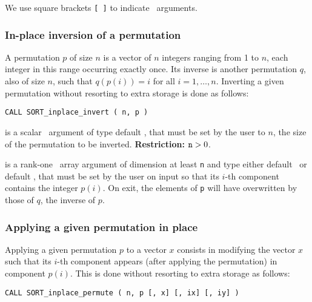 \documentclass{galahad}
\newcommand{\packagename}{SORT}
\begin{document}
\noindent
We use square brackets {\tt [ ]} to indicate \optional\ arguments.

\subsubsection{In-place inversion of a permutation}

A permutation $p$ of size $n$ is a vector of $n$ integers ranging from 1 to $n$,
each integer in this range occurring exactly once. Its inverse is another
permutation $q$, also of size $n$, such that $q(p(i))=i$ for all $i=1,\ldots,n$.
Inverting a given permutation without resorting to extra storage is done as
follows:
\vspace*{1mm}

\hspace{8mm}
{\tt CALL \packagename\_inplace\_invert ( n, p )}

\vspace*{-3mm}
\begin{description}
 is a scalar \intentin\ argument of type default
\integer, that must be set by the user to $n$, the size of the permutation to
be inverted.
{\bf Restriction:} ${\tt n} > 0$.

 is a rank-one \intentinout\ array argument of
dimension at least {\tt n} and type either default
\integer\ or default \realdp, that must be set by the user
on input so that its $i$-th component contains the integer $p(i)$.
On exit, the elements of {\tt p} will have overwritten by those of $q$, the
inverse of $p$.

\end{description}

\subsubsection{Applying a given permutation in place}

Applying a given permutation $p$ to a vector $x$ consists in modifying the
vector $x$ such that its $i$-th component appears (after applying the
permutation) in component $p(i)$.
This is done without resorting to extra storage as follows:
\vspace*{1mm}

{\tt CALL \packagename\_inplace\_permute ( n, p [, x] [, ix] [, iy] )}
\end{document}
